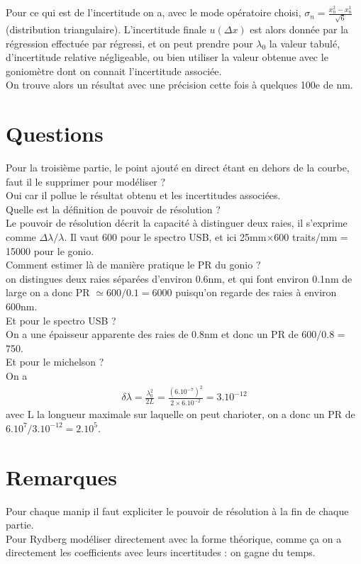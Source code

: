 \documentclass[12pt,prb,aps,epsf]{report}
\begin{document}
Pour ce qui est de l'incertitude on a, avec le mode opératoire choisi, $\sigma_n = \frac{x_n^2-x_n^1}{\sqrt{6} }$ (distribution triangulaire). L'incertitude finale $u(\Delta x)$ est alors donnée par la régression effectuée par régressi, et on peut prendre pour $\lambda_0$ la valeur tabulé, d'incertitude relative négligeable, ou bien utiliser la valeur obtenue avec le goniomètre dont on connait l'incertitude associée.\\
On trouve alors un résultat avec une précision cette fois à quelques 100e de nm.

\section*{Questions}
Pour la troisième partie, le point ajouté en direct étant en dehors de la courbe, faut il le supprimer pour modéliser ?\\
Oui car il pollue le résultat obtenu et les incertitudes associées.\\

Quelle est la définition de pouvoir de résolution ?\\ 
Le pouvoir de résolution décrit la capacité à distinguer deux raies, il s'exprime comme $\Delta\lambda/\lambda$. Il vaut 600 pour le spectro USB, et ici 25mm$\times$600 traits/mm = 15000 pour le gonio.\\

Comment estimer là de manière pratique le PR du gonio ?\\
on distingues deux raies séparées d'environ 0.6nm, et qui font environ 0.1nm de large on a donc PR $\simeq 600/0.1 = 6000$ puisqu'on regarde des raies à environ 600nm.\\

Et pour le spectro USB ?\\
On a une épaisseur apparente des raies de 0.8nm et donc un PR de 600/0.8 = 750.\\

Et pour le michelson ?\\
On a 
\begin{eqnarray}
\delta \lambda = \frac{\lambda_0^2}{2L} = \frac{(6.10^{-7})^2}{2\times 6.10^{-2}} =  3.10^{-12}
\end{eqnarray}
avec L la longueur maximale sur laquelle on peut charioter, on a donc un PR de $6.10^7/3.10^{-12}=2.10^5$.

\section*{Remarques}
Pour chaque manip il faut expliciter le pouvoir de résolution à la fin de chaque partie.\\
Pour Rydberg modéliser directement avec la forme théorique, comme ça on a directement les coefficients avec leurs incertitudes : on gagne du temps.
\end{document}
